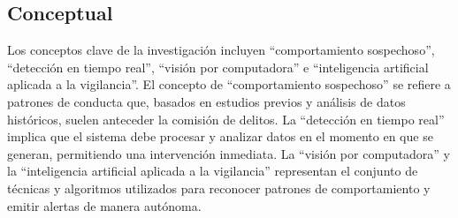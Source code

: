 \subsection{Conceptual}
Los conceptos clave de la investigación incluyen “comportamiento sospechoso”, “detección en tiempo real”, “visión por computadora” e “inteligencia artificial aplicada a la vigilancia”. El concepto de “comportamiento sospechoso” se refiere a patrones de conducta que, basados en estudios previos y análisis de datos históricos, suelen anteceder la comisión de delitos. La “detección en tiempo real” implica que el sistema debe procesar y analizar datos en el momento en que se generan, permitiendo una intervención inmediata. La “visión por computadora” y la “inteligencia artificial aplicada a la vigilancia” representan el conjunto de técnicas y algoritmos utilizados para reconocer patrones de comportamiento y emitir alertas de manera autónoma.

